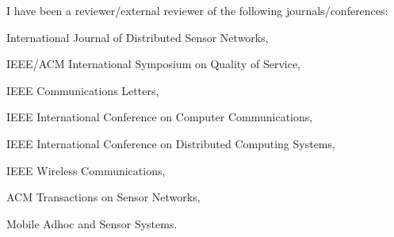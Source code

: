 I have been a reviewer/external reviewer of the following journals/conferences:

International Journal of Distributed Sensor Networks, 

IEEE/ACM International Symposium on Quality of Service,

IEEE Communications Letters,

IEEE International Conference on Computer Communications,

IEEE International Conference on Distributed Computing Systems,

IEEE Wireless Communications,

ACM Transactions on Sensor Networks,

Mobile Adhoc and Sensor Systems.